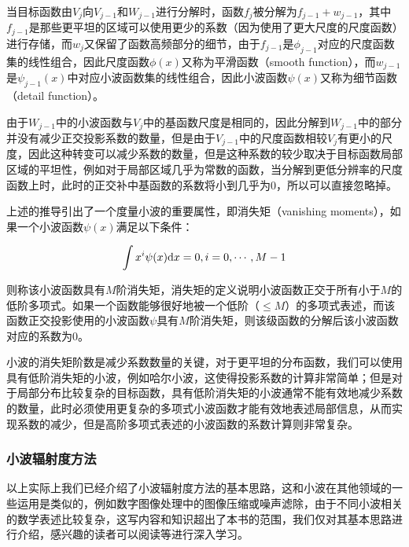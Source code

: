 当目标函数由$V_j$向$V_{j-1}$和$W_{j-1}$进行分解时，函数$f_j$被分解为$f_{j-1}+w_{j-1}$，其中$f_{j-1}$是那些更平坦的区域可以使用更少的系数（因为使用了更大尺度的尺度函数）进行存储，而$w_j$又保留了函数高频部分的细节，由于$f_{j-1}$是$\phi_{j-1}$对应的尺度函数集的线性组合，因此尺度函数$\phi(x)$又称为平滑函数（smooth function），而$w_{j-1}$是$\psi_{j-1}(x)$中对应小波函数集的线性组合，因此小波函数$\psi(x)$又称为细节函数（detail function）。

由于$W_{j-1}$中的小波函数与$V_j$中的基函数尺度是相同的，因此分解到$W_{j-1}$中的部分并没有减少正交投影系数的数量，但是由于$V_{j-1}$中的尺度函数相较$V_j$有更小的尺度，因此这种转变可以减少系数的数量，但是这种系数的较少取决于目标函数局部区域的平坦性，例如对于局部区域几乎为常数的函数，当分解到更低分辨率的尺度函数上时，此时的正交补中基函数的系数将小到几乎为0，所以可以直接忽略掉。

上述的推导引出了一个度量小波的重要属性，即消失矩（vanishing moments），如果一个小波函数$\psi(x)$满足以下条件：

\begin{equation}
	\int x^{i} \psi(x){\rm d}x=0,i=0,\cdots,M-1
\end{equation}

\noindent 则称该小波函数具有$M$阶消失矩，消失矩的定义说明小波函数正交于所有小于$M$的低阶多项式。如果一个函数能够很好地被一个低阶（$\leq M$）的多项式表述，而该函数正交投影使用的小波函数$\psi$具有$M$阶消失矩，则该级函数的分解后该小波函数对应的系数为0。

小波的消失矩阶数是减少系数数量的关键，对于更平坦的分布函数，我们可以使用具有低阶消失矩的小波，例如哈尔小波，这使得投影系数的计算非常简单；但是对于局部分布比较复杂的目标函数，具有低阶消失矩的小波通常不能有效地减少系数的数量，此时必须使用更复杂的多项式小波函数才能有效地表述局部信息，从而实现系数的减少，但是高阶多项式表述的小波函数的系数计算则非常复杂。




\subsubsection{小波辐射度方法}\label{sec:r-wavelet-radiosity}
以上实际上我们已经介绍了小波辐射度方法的基本思路，这和小波在其他领域的一些运用是类似的，例如数字图像处理中的图像压缩或噪声滤除\cite{b:DigitalImageProcessing}，由于不同小波相关的数学表述比较复杂，这写内容和知识超出了本书的范围，我们仅对其基本思路进行介绍，感兴趣的读者可以阅读\cite{a:WaveletaRadiosity,a:WaveletMethodsforComputerGraphics,a:WaveletRadiosityonArbitraryPlanarSurfaces,a:RadiosityinFlatland}等进行深入学习。

